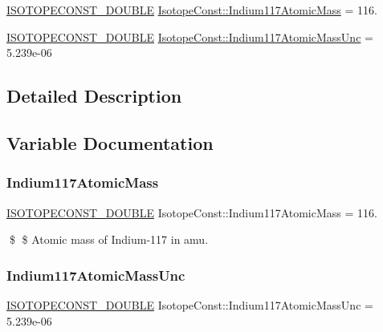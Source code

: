 \begin{DoxyCompactItemize}
\item 
\mbox{\hyperlink{group___isotope_const-_macros_ga8f45a7272ce02c0b4c65c44636ed719a}{I\+S\+O\+T\+O\+P\+E\+C\+O\+N\+S\+T\+\_\+\+D\+O\+U\+B\+LE}} \mbox{\hyperlink{group___isotope_const-_indium-_in117_ga0f4dc6d5a876de4a4ab6ca707bfee571}{Isotope\+Const\+::\+Indium117\+Atomic\+Mass}} = 116.
\item 
\mbox{\hyperlink{group___isotope_const-_macros_ga8f45a7272ce02c0b4c65c44636ed719a}{I\+S\+O\+T\+O\+P\+E\+C\+O\+N\+S\+T\+\_\+\+D\+O\+U\+B\+LE}} \mbox{\hyperlink{group___isotope_const-_indium-_in117_ga9fc4cdd69ff2dfa663c2657cfbbec451}{Isotope\+Const\+::\+Indium117\+Atomic\+Mass\+Unc}} = 5.\+239e-\/06
\end{DoxyCompactItemize}


\subsection{Detailed Description}


\subsection{Variable Documentation}
\mbox{\label{group___isotope_const-_indium-_in117_ga0f4dc6d5a876de4a4ab6ca707bfee571}} 
\subsubsection{\texorpdfstring{Indium117\+Atomic\+Mass}{Indium117AtomicMass}}
{\footnotesize\ttfamily \mbox{\hyperlink{group___isotope_const-_macros_ga8f45a7272ce02c0b4c65c44636ed719a}{I\+S\+O\+T\+O\+P\+E\+C\+O\+N\+S\+T\+\_\+\+D\+O\+U\+B\+LE}} Isotope\+Const\+::\+Indium117\+Atomic\+Mass = 116.}

\$ \$ Atomic mass of Indium-\/117 in amu. \mbox{\label{group___isotope_const-_indium-_in117_ga9fc4cdd69ff2dfa663c2657cfbbec451}} 
\subsubsection{\texorpdfstring{Indium117\+Atomic\+Mass\+Unc}{Indium117AtomicMassUnc}}
{\footnotesize\ttfamily \mbox{\hyperlink{group___isotope_const-_macros_ga8f45a7272ce02c0b4c65c44636ed719a}{I\+S\+O\+T\+O\+P\+E\+C\+O\+N\+S\+T\+\_\+\+D\+O\+U\+B\+LE}} Isotope\+Const\+::\+Indium117\+Atomic\+Mass\+Unc = 5.\+239e-\/06}

